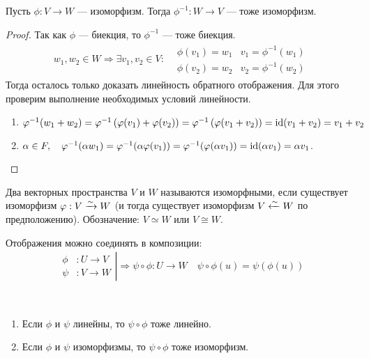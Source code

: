 \begin{Suggestion}
Пусть $\phi: V \rightarrow W$ --- изоморфизм. Тогда $\phi^{-1}: W \rightarrow V$ --- тоже изоморфизм.
\end{Suggestion}
\begin{proof}
Так как $\phi$ --- биекция, то $\phi^{-1}$ --- тоже биекция.
\begin{gather*}
w_1, w_2 \in W \Rightarrow \exists v_1, v_2 \in V:
\begin{aligned} 
&\phi(v_1) = w_1 & v_1 = \phi^{-1}(w_1)\\ 
&\phi(v_2) = w_2 & v_2 = \phi^{-1}(w_2)
\end{aligned} 
\end{gather*}
Тогда осталось только доказать линейность обратного отображения. Для этого проверим выполнение необходимых условий линейности.
\begin{enumerate}
\item $ \varphi^{-1}(w_1 + w_2) = \varphi^{-1}\left(\varphi(v_1) + \varphi(v_2)\right) = \varphi^{-1}\left(\varphi(v_1 + v_2)\right) = \mathrm{id} (v_1 + v_2) = v_1 + v_2$
\item $\alpha \in F, \quad \varphi^{-1}(\alpha w_1) = \varphi^{-1}(\alpha\varphi(v_1)) = \varphi^{-1}(\varphi(\alpha v_1)) = \mathrm{id} (\alpha v_1) = \alpha v_1$.
\end{enumerate}
\end{proof}

\begin{Def}
Два векторных пространства $V$ и $W$ называются изоморфными, если существует изоморфизм $\varphi: V \xrightarrow{\sim} W$ (и тогда существует изоморфизм $V \xleftarrow{\sim} W$ по предположению). Обозначение: $V \simeq W$ или $V \cong W$.
\end{Def}

Отображения можно соединять в композиции:
\begin{gather*}
\left.
\begin{aligned}
\phi&: U \rightarrow V \\
\psi&: V \rightarrow W
\end{aligned}
\right|\Rightarrow \psi \circ \phi : U \rightarrow W \quad \psi \circ \phi(u) = \psi(\phi(u))
\end{gather*}

\begin{Suggestion}\ 
\begin{enumerate}
\item Если $\phi$ и $\psi$ линейны, то $\psi \circ \phi$ тоже линейно.
\item Если $\phi$ и $\psi$ изоморфизмы, то $\psi \circ \phi$ тоже изоморфизм.
\end{enumerate}
\end{Suggestion}

